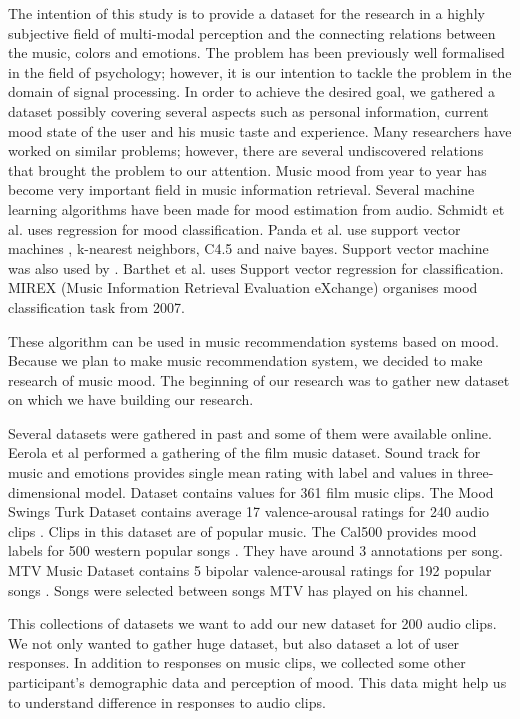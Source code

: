 \documentclass[a4paper]{article}
\begin{document}
The intention of this study is to provide a dataset for the research in a highly subjective field of multi-modal perception and the connecting relations between the music, colors and emotions. The problem has been previously well formalised in the field of psychology; however, it is our intention to tackle the problem in the domain of signal processing. In order to achieve the desired goal, we gathered a dataset possibly covering several aspects such as personal information, current mood state of the user and his music taste and experience. Many researchers have worked on similar problems; however, there are several undiscovered relations that brought the problem to our attention. Music mood from year to year has become very important field in music information retrieval. Several machine learning algorithms have been made for mood estimation from audio. Schmidt et al. \cite{schmidt2009projection} uses regression for mood classification. Panda et al. use support vector machines \cite{ben2010user}, k-nearest neighbors, C4.5 and naive bayes. Support vector machine was also used by \cite{laurier2007audio}. Barthet et al. uses Support vector regression for classification.
MIREX (Music Information Retrieval Evaluation eXchange) organises mood classification task from 2007. 

These algorithm can be used in music recommendation systems based on mood. Because we plan to make music recommendation system, we decided to make research of music mood. The beginning of our research was to gather new dataset on which we have building our research.

Several datasets were gathered in past and some of them were available online. Eerola et al \cite{eerola2010comparison} performed a gathering of the film music dataset. Sound track for music and emotions provides single mean rating with label and values in three-dimensional model. Dataset contains values for 361 film music clips.  The Mood Swings Turk Dataset contains average 17 valence-arousal ratings for 240 audio clips \cite{schmidt2011modeling}. Clips in this dataset are of popular music. The Cal500 provides mood labels for 500 western popular songs \cite{turnbull2008semantic}. They have around 3 annotations per song. MTV Music Dataset contains 5 bipolar valence-arousal ratings for 192 popular songs \cite{schuller2010mister}. Songs were selected between songs MTV has played on his channel.

This collections of datasets we want to add our new dataset for 200 audio clips. We not only wanted to gather huge dataset, but also dataset a lot of user responses. In addition to responses on music clips, we collected some other participant's demographic data and perception of mood. This data might help us to understand difference in responses to audio clips.
\end{document}
